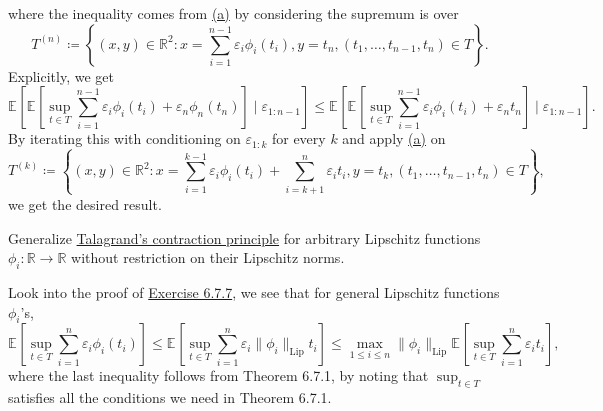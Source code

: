 \begin{answer}
\begin{enumerate}[(a)]
\[		      \]
		      where the inequality comes from \hyperref[ex6.7.7:a]{(a)} by considering the supremum is over
		      \[
			      T^{(n)}
			      \coloneqq \left\{ (x, y) \in \mathbb{R} ^2 \colon x = \sum_{i=1}^{n-1} \varepsilon _i \phi _i(t_i), y = t_n, (t _1, \dots , t_{n-1}, t_n) \in T \right\}.
		      \]
		      Explicitly, we get
		      \[
			      \mathbb{E}_{}\left[ \mathbb{E}_{}\left[\sup _{t \in T} \sum_{i=1}^{n-1} \varepsilon _i \phi _i(t_i) + \varepsilon _n \phi _n(t_n)\right] \mid \varepsilon _{1 \colon n-1} \right]
			      \leq \mathbb{E}_{}\left[ \mathbb{E}_{}\left[\sup _{t \in T} \sum_{i=1}^{n-1} \varepsilon _i \phi _i(t_i) + \varepsilon _n t_n\right] \mid \varepsilon _{1\colon n-1} \right].
		      \]
		      By iterating this with conditioning on \(\varepsilon _{1 \colon k}\) for every \(k\) and apply \hyperref[ex6.7.7:a]{(a)} on
		      \[
			      T^{(k)}
			      \coloneqq \left\{ (x, y) \in \mathbb{R} ^2 \colon x = \sum_{i=1}^{k-1} \varepsilon _i \phi _i(t_i) + \sum_{i=k+1}^{n} \varepsilon _i t_i, y = t_k, (t _1, \dots , t_{n-1}, t_n) \in T \right\},
		      \]
		      we get the desired result.
	\end{enumerate}
\end{answer}

\begin{problem*}[Exercise 6.7.8]\label{ex6.7.8}
	Generalize \hyperref[ex6.7.7]{Talagrand's contraction principle} for arbitrary Lipschitz functions \(\phi _i \colon \mathbb{R} \to \mathbb{R} \) without restriction on their Lipschitz norms.
\end{problem*}
\begin{answer}
	Look into the proof of \hyperref[ex6.7.7]{Exercise 6.7.7}, we see that for general Lipschitz functions \(\phi _i\)'s,
	\[
		\mathbb{E}_{}\left[\sup _{t \in T} \sum_{i=1}^{n} \varepsilon _i \phi _i(t_i) \right]
		\leq \mathbb{E}_{}\left[\sup _{t \in T} \sum_{i=1}^{n} \varepsilon _i \lVert \phi _i \rVert _{\mathrm{Lip} } t_i \right]
		\leq \max _{1 \leq i \leq n} \lVert \phi _i \rVert _{\mathrm{Lip} } \mathbb{E}_{}\left[\sup _{t \in T} \sum_{i=1}^{n} \varepsilon _i t_i \right],
	\]
	where the last inequality follows from Theorem 6.7.1, by noting that \(\sup _{t \in T} \) satisfies all the conditions we need in Theorem 6.7.1.
\end{answer}